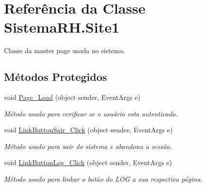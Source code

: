 \hypertarget{class_sistema_r_h_1_1_site1}{
\section{Referência da Classe SistemaRH.Site1}
\label{class_sistema_r_h_1_1_site1}
}


Classe da master page usada no sistema.  


\subsection*{Métodos Protegidos}
\begin{DoxyCompactItemize}
\item 
void \hyperlink{class_sistema_r_h_1_1_site1_aee80a8fb90972d65f101356656cd3587}{Page\_\-Load} (object sender, EventArgs e)
\begin{DoxyCompactList}\small\item\em Método usado para verificar se o usuário esta autenticado. \item\end{DoxyCompactList}\item 
void \hyperlink{class_sistema_r_h_1_1_site1_ad111bb683134517aaac7b25c42391405}{LinkButtonSair\_\-Click} (object sender, EventArgs e)
\begin{DoxyCompactList}\small\item\em Método usado para sair do sistema e abandona a sessão. \item\end{DoxyCompactList}\item 
void \hyperlink{class_sistema_r_h_1_1_site1_a38df5ec53212f978c2ef2f7fea8bac27}{LinkButtonLog\_\-Click} (object sender, EventArgs e)
\begin{DoxyCompactList}\small\item\em Método usado para linkar o botão do LOG a sua respectiva página. \item\end{DoxyCompactList}\end{DoxyCompactItemize}
